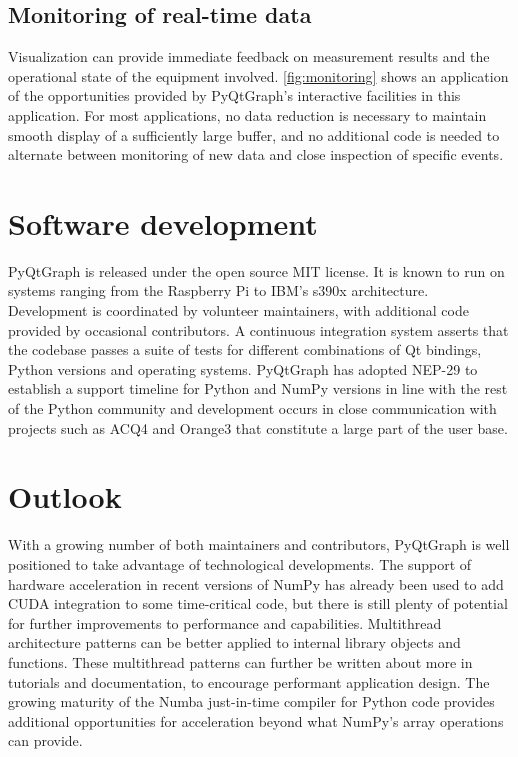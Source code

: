 \documentclass[journal]{vgtc}                %
\begin{document}
\subsection{Monitoring of real-time data}
\makeMonitoringFig
Visualization can provide immediate feedback on measurement results and the operational state of the equipment involved. \autoref{fig:monitoring} shows an application of the opportunities provided by PyQtGraph's interactive facilities in this application. For most applications, no data reduction is necessary to maintain smooth display of a sufficiently large buffer, and no additional code is needed to alternate between monitoring of new data and close inspection of specific events.
\color{black}

\section{Software development}
PyQtGraph is released under the open source MIT license. It is known to run on systems ranging from the Raspberry Pi to IBM's s390x architecture. Development is coordinated by volunteer maintainers, with additional code provided by occasional contributors. A continuous integration system asserts that the codebase passes a suite of tests for different combinations of Qt bindings, Python versions and operating systems. PyQtGraph has adopted NEP-29\cite{NEP-29} to establish a support timeline for Python and NumPy versions in line with the rest of the Python community and development occurs in close communication with projects such as ACQ4 and Orange3\cite{JMLR:demsar13a} that constitute a large part of the user base.

\section{Outlook}
With a growing number of both maintainers and contributors, PyQtGraph is well positioned to take advantage of technological developments. The support of hardware acceleration in recent versions of NumPy has already been used to add CUDA integration to some time-critical code, but there is still plenty of potential for further improvements to performance and capabilities. Multithread architecture patterns can be better applied to internal library objects and functions. These multithread patterns can further be written about more in tutorials and documentation, to encourage performant application design. The growing maturity of the Numba just-in-time compiler \cite{lam2015numba} for Python code provides additional opportunities for acceleration beyond what NumPy's array operations can provide.
\end{document}
